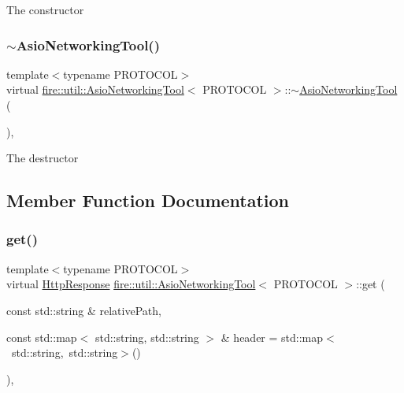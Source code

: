 The constructor \mbox{\label{a01601_afc51c728e1bd136b6729ac892df490ab}} 
\subsubsection{\texorpdfstring{$\sim$\+Asio\+Networking\+Tool()}{~AsioNetworkingTool()}}
{\footnotesize\ttfamily template$<$typename P\+R\+O\+T\+O\+C\+OL$>$ \\
virtual \hyperlink{a01601}{fire\+::util\+::\+Asio\+Networking\+Tool}$<$ P\+R\+O\+T\+O\+C\+OL $>$\+::$\sim$\hyperlink{a01601}{Asio\+Networking\+Tool} (\begin{DoxyParamCaption}{ }\end{DoxyParamCaption})\hspace{0.3cm}{\ttfamily [inline]}, {\ttfamily [virtual]}}

The destructor 

\subsection{Member Function Documentation}
\mbox{\label{a01601_a42609f768f245acf0867889e920c5d49}} 
\subsubsection{\texorpdfstring{get()}{get()}}
{\footnotesize\ttfamily template$<$typename P\+R\+O\+T\+O\+C\+OL$>$ \\
virtual \hyperlink{a01605}{Http\+Response} \hyperlink{a01601}{fire\+::util\+::\+Asio\+Networking\+Tool}$<$ P\+R\+O\+T\+O\+C\+OL $>$\+::get (\begin{DoxyParamCaption}\item[{const std\+::string \&}]{relative\+Path,  }\item[{const std\+::map$<$ std\+::string, std\+::string $>$ \&}]{header = {\ttfamily std\+:\+:map$<$~std\+:\+:string,~std\+:\+:string$>$()} }\end{DoxyParamCaption})\hspace{0.3cm}{\ttfamily [inline]}, {\ttfamily [virtual]}}

